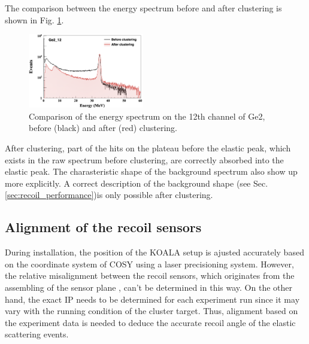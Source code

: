 \documentclass[number,5p]{elsarticle}
\begin{document}
The comparison between the energy spectrum before and after clustering is shown in
Fig. \ref{fig:clustering}.
\begin{figure}[h]
  \centering
  \includegraphics[width=0.45\textwidth]{./clustering.png}
  \caption{Comparison of the energy spectrum on the 12th channel of Ge2, before (black) and after
    (red) clustering.}
  \label{fig:clustering}
\end{figure}
After clustering, part of the hits on the plateau before the elastic peak, which exists in the raw spectrum before clustering, are correctly absorbed into the elastic peak.
The charasteristic shape of the background spectrum also show up more explicitly.
A correct description of the background shape (see Sec. \ref{sec:recoil_performance})is only possible after clustering.

\subsection{Alignment of the recoil sensors}
\label{sec:alignment}

During installation, the position of the KOALA setup is ajusted accurately based on the
coordinate system of COSY using a laser precisioning system.
However, the relative misalignment between the recoil sensors, which originates from the assembling of the sensor plane , can't be determined in this way.
On the other hand, the exact IP needs to be determined for each experiment run
since it may vary with the running condition of the cluster target.
Thus, alignment based on the experiment data is needed to deduce the accurate recoil angle of the elastic scattering events.
\end{document}
